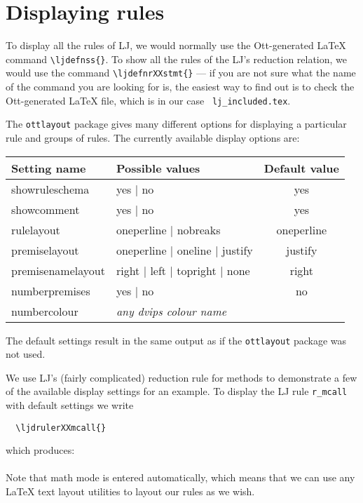 \documentclass{article}
\begin{document}
\section{Displaying rules}
%
To display all the rules of LJ, we would normally use the Ott-generated \LaTeX{} command
\verb+\ljdefnss{}+. To show all the rules of the LJ's reduction relation, we
would use the command \verb+\ljdefnrXXstmt{}+ --- if you are not sure what the
name of the command you are looking for is, the easiest way to find out is to
check the Ott-generated \LaTeX{} file, which is in our case {\tt
  lj\_included.tex}.

The \texttt{ottlayout} package gives many different options for displaying a
particular rule and groups of rules. The currently available display options
are:
%
\begin{center}
\begin{tabular}{|l|l|c|}
\hline
{\bf Setting name} & {\bf Possible values} & {\bf Default value}\\\hline
\hline
showruleschema & yes $|$ no & yes\\\hline
showcomment & yes $|$ no & yes\\\hline
rulelayout & oneperline $|$ nobreaks & oneperline\\\hline
premiselayout & oneperline $|$ oneline $|$ justify & justify\\\hline
premisenamelayout & right $|$ left $|$ topright $|$ none & right\\\hline
numberpremises & yes $|$ no & no\\\hline
numbercolour & {\it any dvips colour name} & \color{Gray}{Gray}\\\hline
\end{tabular}
\end{center}
%
The default settings result in the same output as if the \texttt{ottlayout}
package was not used.

We use  LJ's (fairly complicated) reduction rule for methods to
demonstrate a few of the available display settings for an example. To
display the LJ rule {\tt r\_mcall} with default settings we write
%
\begin{verbatim}
  \ljdrulerXXmcall{}
\end{verbatim}
%
which produces:\\[2ex]
\ljdrulerXXmcall{}\\[2ex]
%
Note that math mode is entered automatically, which means that we can use any
\LaTeX{} text layout utilities to layout our rules as we wish.
\end{document}
